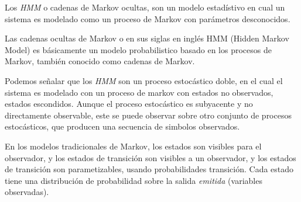 












Los \emph{HMM} o cadenas de Markov ocultas, son un modelo estadístivo en cual un sistema es modelado como un proceso de Markov con parámetros desconocidos.

Las cadenas ocultas de Markov o en sus siglas en inglés HMM (Hidden Markov Model) es básicamente un modelo probabilistico basado en los procesos de Markov, también conocido como cadenas de Markov. 

Podemos señalar que los \emph{HMM} son un proceso estocástico doble, en el cual el sistema es modelado con un proceso de markov con estados no observados, estados escondidos. Aunque el proceso estocástico es subyacente
y no directamente observable, este se puede observar sobre otro conjunto de procesos estocásticos, que producen una secuencia de simbolos observados.

En los modelos tradicionales de Markov, los estados son visibles para el observador, y los estados de transición son visibles a un observador, y los estados de transición son parametizables, usando probabilidades transición.
Cada estado tiene una distribución de probabilidad sobre la salida \emph{emitida} (variables observadas).

